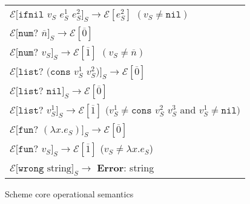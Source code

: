 \begin{figure}[p]
\begin{tabular}{l}
$\mathscr{E}[\mathtt{ifnil}$ $v_{S}$ $e_{S}^{1}$ $e_{S}^{2}]_{S}\rightarrow\mathscr{E}[e_{S}^{2}]$ $(v_{S}\neq\mathtt{nil})$ \\

$\mathscr{E}[\mathtt{num?}$ $\overline{n}]_{S}\rightarrow\mathscr{E}[\overline{0}]$ \\

$\mathscr{E}[\mathtt{num?}$ $v_{S}]_{S}\rightarrow\mathscr{E}[\overline{1}]$ $(v_{S}\neq\overline{n})$ \\

$\mathscr{E}[\mathtt{list?}$ $(\mathtt{cons}$ $v_{S}^{1}$ $v_{S}^{2})]_{S}\rightarrow\mathscr{E}[\overline{0}]$ \\

$\mathscr{E}[\mathtt{list?}$ $\mathtt{nil}]_{S}\rightarrow\mathscr{E}[\overline{0}]$ \\

$\mathscr{E}[\mathtt{list?}$ $v_{S}^{1}]_{S}\rightarrow\mathscr{E}[\overline{1}]$ $(v_{S}^{1}\neq\mathtt{cons}$ $v_{S}^{2}$ $v_{S}^{3}$ and $v_{S}^{1}\neq\mathtt{nil})$ \\

$\mathscr{E}[\mathtt{fun?}$ $(\lambda x.e_{S})]_{S}\rightarrow\mathscr{E}[\overline{0}]$ \\

$\mathscr{E}[\mathtt{fun?}$ $v_{S}]_{S}\rightarrow\mathscr{E}[\overline{1}]$ ($v_{S}\neq\lambda x.e_{S}$) \\

$\mathscr{E}[\mathtt{wrong}$ $\mathrm{string}]_{S}\rightarrow$ \textbf{Error}: string
\end{tabular}
\caption{Scheme core operational semantics}
\label{scos}
\end{figure}
